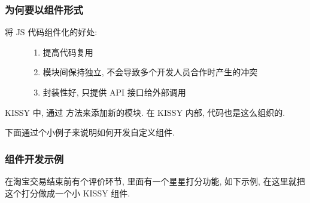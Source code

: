 \documentclass[letterpaper,10pt,english]{sphinxmanual}
\begin{document}
\subsubsection{为何要以组件形式}
\label{quickstart/yourwidgets:id2}\begin{description}
\item[{将 JS 代码组件化的好处:}] \leavevmode\begin{enumerate}
\item {}
提高代码复用

\item {}
模块间保持独立, 不会导致多个开发人员合作时产生的冲突

\item {}
封装性好, 只提供 API 接口给外部调用

\end{enumerate}

\end{description}

KISSY 中, 通过 {\hyperref[api/seed/loader/add.ver1.2:Loader.KISSY.add]{}} 方法来添加新的模块. 在 KISSY 内部, 代码也是这么组织的.

下面通过个小例子来说明如何开发自定义组件.


\subsubsection{组件开发示例}
\label{quickstart/yourwidgets:id3}
在淘宝交易结束前有个评价环节, 里面有一个星星打分功能, 如下示例, 在这里就把这个打分做成一个小 KISSY 组件.
\end{document}
